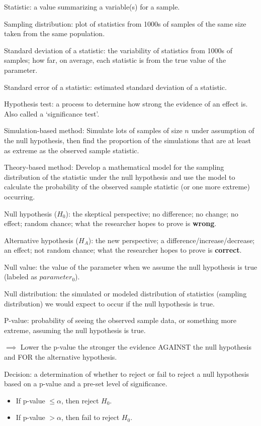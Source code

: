 \documentclass[
]{report}
\begin{document}
Statistic: a value summarizing a variable(s) for a sample.

Sampling distribution: plot of statistics from 1000s of samples of the same size taken from the same population.

Standard deviation of a statistic: the variability of statistics from 1000s of samples; how far, on average, each statistic is from the true value of the parameter.

Standard error of a statistic: estimated standard deviation of a statistic.

Hypothesis test: a process to determine how strong the evidence of an effect is. Also called a `significance test'.

Simulation-based method: Simulate lots of samples of size \(n\) under assumption of the null hypothesis, then find the proportion of the simulations that are at least as extreme as the observed sample statistic.

Theory-based method: Develop a mathematical model for the sampling distribution of the statistic under the null hypothesis and use the model to calculate the probability of the observed sample statistic (or one more extreme) occurring.

Null hypothesis (\(H_0\)): the skeptical perspective; no difference; no change; no effect; random chance; what the researcher hopes to prove is \textbf{wrong}.

Alternative hypothesis (\(H_A\)): the new perspective; a difference/increase/decrease; an effect; not random chance; what the researcher hopes to prove is \textbf{correct}.

Null value: the value of the parameter when we assume the null hypothesis is true (labeled as \(parameter_0\)).

Null distribution: the simulated or modeled distribution of statistics (sampling distribution) we would expect to occur if the null hypothesis is true.

P-value: probability of seeing the observed sample data, or something more extreme, assuming the null hypothesis is true.

\(\implies\) Lower the p-value the stronger the evidence AGAINST the null hypothesis and FOR the alternative hypothesis.

Decision: a determination of whether to reject or fail to reject a null hypothesis based on a p-value and a pre-set level of significance.

\begin{itemize}
\item
  If p-value \(\leq \alpha\), then reject \(H_0\).
\item
  If p-value \(> \alpha\), then fail to reject \(H_0\).
\end{itemize}
\end{document}
